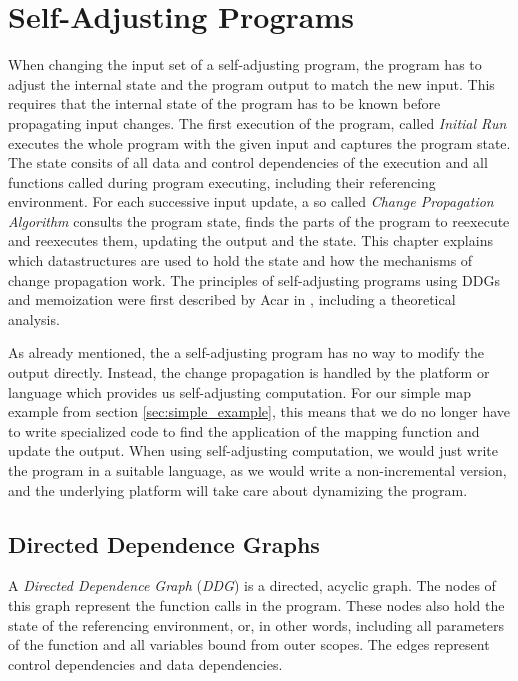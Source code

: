 
\chapter{Self-Adjusting Programs}
\label{ch:self_adjusting}

When changing the input set of a self-adjusting program, the program has to adjust the internal state and the program output to match the new input. This requires that the internal state of the program has to be known before propagating input changes. The first execution of the program, called \textit{Initial Run} executes the whole program with the given input and captures the program state. The state consits of all data and control dependencies of the execution and all functions called during program executing, including their referencing environment. 
For each successive input update, a so called \textit{Change Propagation Algorithm} consults the program state, finds the parts of the program to reexecute and reexecutes them, updating the output and the state.  
This chapter explains which datastructures are used to hold the state and how the mechanisms of change propagation work. The principles of self-adjusting programs using DDGs and memoization were first described by Acar in \cite{Acar2005thesis}, including a theoretical analysis. 

As already mentioned, the a self-adjusting program has no way to modify the output directly. Instead, the change propagation is handled by the platform or language which provides us self-adjusting computation. For our simple map example from section \ref{sec:simple_example}, this means that we do no longer have to write specialized code to find the application of the mapping function and update the output. When using self-adjusting computation, we would just write the program in a suitable language, as we would write a non-incremental version, and the underlying platform will take care about dynamizing the program.

\section{Directed Dependence Graphs}

A \textit{Directed Dependence Graph} (\textit{DDG}) is a directed, acyclic graph. The nodes of this graph represent the function calls in the program. These nodes also hold the state of the referencing environment, or, in other words, including all parameters of the function and all variables bound from outer scopes. The edges represent control dependencies and data dependencies. 

